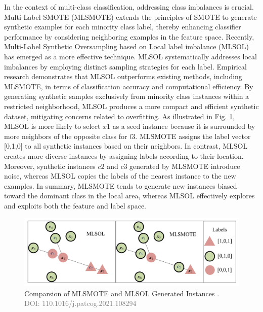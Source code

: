 In the context of multi-class classification, addressing class imbalances is crucial. Multi-Label SMOTE \cite{charte2015mlsmote} (MLSMOTE) extends the principles of SMOTE to generate synthetic examples for each minority class label, thereby enhancing classifier performance by considering neighboring examples in the feature space. Recently, Multi-Label Synthetic Oversampling based on Local label imbalance \cite{liu2022multi} (MLSOL) has emerged as a more effective technique. MLSOL systematically addresses local imbalances by employing distinct sampling strategies for each label. Empirical research demonstrates that MLSOL outperforms existing methods, including MLSMOTE, in terms of classification accuracy and computational efficiency. By generating synthetic samples exclusively from minority class instances within a restricted neighborhood, MLSOL produces a more compact and efficient synthetic dataset, mitigating concerns related to overfitting.
As illustrated in Fig. \ref{fig:mlsmote_mlsol}, MLSOL is more likely to select $x1$ as a seed instance because it is surrounded by more neighbors of the opposite class for $l3$. MLSMOTE assigns the label vector [0,1,0] to all synthetic instances based on their neighbors. In contrast, MLSOL creates more diverse instances by assigning labels according to their location. Moreover, synthetic instances $c2$ and $c3$ generated by MLSMOTE introduce noise, whereas MLSOL copies the labels of the nearest instance to the new examples. In summary, MLSMOTE tends to generate new instances biased toward the dominant class in the local area, whereas MLSOL effectively explores and exploits both the feature and label space.
\begin{figure}[!ht]

    \begin{center}
      \includegraphics[width=1\textwidth]{3_State-of-the-art/fig/mlsmote_mlsol.png}
    \end{center}

    \caption{Comparsion of MLSMOTE and MLSOL Generated Instances \cite{liu2022multi}.\\ \textcolor{gray}{\fontsize{10}{0}\selectfont DOI: 110.1016/j.patcog.2021.108294}}
    \label{fig:mlsmote_mlsol}

    \end{figure}
    
